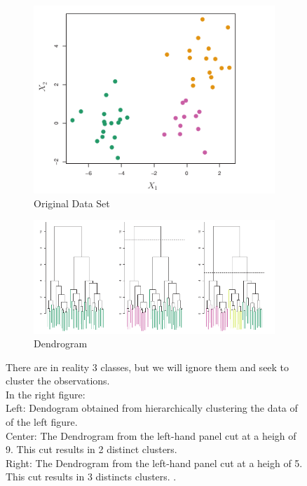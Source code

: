 \begin{figure}[H]
\begin{subfigure}[b]{0.49\textwidth}
\includegraphics[width=\textwidth]{./chap/1chap/9sec/images/2a_hierarchicalCluster.png}
\caption{Original Data Set}
\label{fig:9.2a_hierarchicalCluster}
\end{subfigure}
\hfill
\begin{subfigure}[b]{0.49\textwidth}
\includegraphics[width=\textwidth]{./chap/1chap/9sec/images/2b_hierarchicalCluster.png}
\caption{Dendrogram}
\label{fig:9.2b_hierarchicalCluster}
\end{subfigure}
\caption{
There are in reality 3 classes, but we will ignore them
and seek to cluster the observations.\\
In the right figure:\\
Left: Dendogram obtained from hierarchically clustering the data of of the left figure.\\
Center: The Dendrogram from the left-hand panel cut at a heigh of 9.
This cut results in 2 distinct clusters.\\
Right: The Dendrogram from the left-hand panel cut at a heigh of 5.
This cut results in 3 distincts clusters.
.}
\end{figure}

